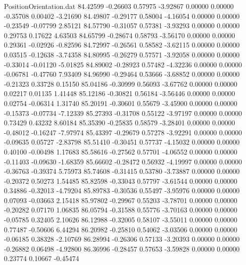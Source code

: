 \begin{filecontents}{PositionOrientation.dat}
  84.42599   -0.26603    0.57975    -3.92867    0.00000    0.00000   -0.35708    0.00402   -3.21690
  84.49807   -0.29177    0.58004    -4.16054    0.00000    0.00000   -0.23549   -0.07799    2.85121
  84.57790   -0.31057    0.57381    -3.93293    0.00000    0.00000    0.29753    0.17622    4.63503
  84.65799   -0.28674    0.58793    -3.56170    0.00000    0.00000    0.29361   -0.02926   -0.82596
  84.72997   -0.26561    0.58582    -3.62115    0.00000    0.00000    0.03515   -0.12638   -3.74358
  84.80995   -0.26279    0.57571    -3.92058    0.00000    0.00000   -0.33014   -0.01120   -5.01825
  84.89002   -0.28923    0.57482    -4.32236    0.00000    0.00000   -0.06781   -0.47760    7.93409
  84.96990   -0.29464    0.53666    -3.68852    0.00000    0.00000   -0.21323    0.33728    0.15150
  85.04186   -0.30999    0.56093    -3.67762    0.00000    0.00000    0.02217    0.01135    1.41448
  85.12186   -0.30821    0.56184    -3.56446    0.00000    0.00000    0.02754   -0.06314    1.31740
  85.20191   -0.30601    0.55679    -3.45900    0.00000    0.00000   -0.15373   -0.07734   -7.12339
  85.27393   -0.31708    0.55122    -3.97197    0.00000    0.00000    0.73429    0.43232    8.60184
  85.35390   -0.25835    0.58579    -3.28401    0.00000    0.00000   -0.48012   -0.16247   -7.97974
  85.43397   -0.29679    0.57278    -3.92291    0.00000    0.00000   -0.09635    0.05727   -2.83798
  85.51410   -0.30451    0.57737    -4.15032    0.00000    0.00000    0.40100   -0.00498    1.17683
  85.58616   -0.27562    0.57701    -4.06552    0.00000    0.00000   -0.11403   -0.09630   -1.68359
  85.66602   -0.28472    0.56932    -4.19997    0.00000    0.00000   -0.36763   -0.39374    5.75973
  85.74608   -0.31415    0.53780    -3.73887    0.00000    0.00000   -0.20372    0.50273    1.54485
  85.82598   -0.33043    0.57797    -3.61544    0.00000    0.00000    0.34886   -0.32013   -4.79204
  85.89783   -0.30536    0.55497    -3.95976    0.00000    0.00000    0.07093   -0.03663    2.15418
  85.97802   -0.29967    0.55203    -3.78701    0.00000    0.00000   -0.20282    0.07170    1.06835
  86.05794   -0.31588    0.55776    -3.70163    0.00000    0.00000   -0.05785    0.32405    2.10626
  86.12988   -0.32005    0.58107    -3.55011    0.00000    0.00000    0.77487   -0.50606    6.44294
  86.20982   -0.25810    0.54062    -3.03506    0.00000    0.00000   -0.06185    0.38328   -2.10769
  86.28994   -0.26306    0.57133    -3.20393    0.00000    0.00000   -0.26882    0.06498   -4.92800
  86.36996   -0.28457    0.57653    -3.59828    0.00000    0.00000    0.23774    0.10667   -0.45474

\end{filecontents}
